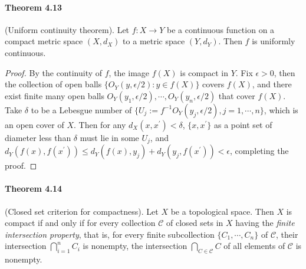 \documentclass{article}
\numberwithin{equation}{section}
\theoremstyle{plain}
\theoremstyle{definition}
\begin{document}
\paragraph{Theorem 4.13\label{thm:4.13}} (Uniform continuity theorem). Let $f:X\to Y$ be a continuous function on a compact metric space $(X,d_X)$ to a metric space $(Y,d_Y)$. Then $f$ is uniformly continuous.
\begin{proof}
By the continuity of $f$, the image $f(X)$ is compact in $Y$. Fix $\epsilon > 0$, then the collection of open balls $\{O_Y(y,\epsilon/2):y\in f(X)\}$ covers $f(X)$, and there exist finite many open balls $O_Y(y_1,\epsilon/2),\cdots,O_Y(y_n,\epsilon/2)$ that cover $f(X)$. Take $\delta$ to be a Lebesgue number of $\{U_j:=f^{-1}O_Y(y_j,\epsilon/2),j=1,\cdots,n\}$, which is an open cover of $X$. Then for any $d_X(x,x^\prime) < \delta$, $\{x,x^\prime\}$ as a point set of diameter less than $\delta$ must lie in some $U_j$, and $d_Y(f(x),f(x^\prime))\leq d_Y(f(x),y_j) + d_Y(y_j,f(x^\prime)) < \epsilon$, completing the proof.
\end{proof}

\paragraph{Theorem 4.14\label{thm:4.14}} (Closed set criterion for compactness). Let $X$ be a topological space. Then $X$ is compact if and only if for every collection $\mathscr{C}$ of closed sets in $X$ having the \textit{finite intersection property}, that is, for every finite subcollection $\{C_1,\cdots,C_n\}$ of $\mathscr{C}$, their intersection $\bigcap_{i=1}^n C_i$ is nonempty, the intersection $\bigcap_{C\in\mathscr{C}}C$ of all elements of $\mathscr{C}$ is nonempty.
\end{document}
